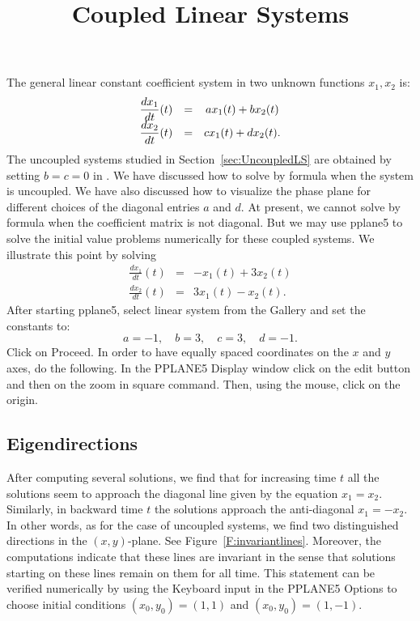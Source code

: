 \documentclass{ximera}
\title{Coupled Linear Systems}
\begin{document}
\begin{abstract}
\end{abstract}
\maketitle

  \label{s:3.5}


The general linear constant coefficient system in two unknown functions 
$x_1,x_2$ is:
\renewcommand{\arraystretch}{1.8}
\begin{equation}\label{lin3}
\begin{array}{ccc}
\displaystyle \frac{dx_1}{dt}(t) & = & ax_1(t) + bx_2(t) \\
\displaystyle \frac{dx_2}{dt}(t) & = & cx_1(t) + dx_2(t).
\end{array}
\end{equation}
\renewcommand{\arraystretch}{1.0}%
The uncoupled systems studied in Section~\ref{sec:UncoupledLS} are obtained 
by setting $b=c=0$ in .  We have discussed how to solve  
by formula  when the system is uncoupled.  We have also 
discussed how to visualize the phase plane for different choices of the 
diagonal entries $a$ and $d$.  At present, we cannot
solve  by formula when the coefficient matrix is not diagonal.
But we may use {\sf pplane5} to solve the initial value problems numerically 
for these coupled systems.  We illustrate this point by solving
\begin{eqnarray*}
\frac{dx_1}{dt}(t) & = &  -x_1(t) + 3x_2(t) \\
\frac{dx_2}{dt}(t) & = &  3x_1(t) - x_2(t).
\end{eqnarray*}
After starting {\sf pplane5}, select {\sf linear system} from the
{\sf Gallery} and set the constants to:
\[
	a = -1,\quad b = 3,\quad c = 3, \quad d = -1.
\]
Click on {\sf Proceed}.  In order to have equally spaced coordinates on
the $x$ and $y$ axes, do the following.   In the {\sf PPLANE5 Display} 
window click on the {\sf edit} button and then on the {\sf zoom in square} 
command.  Then, using the mouse, click on the origin.

\subsection*{Eigendirections}

After computing several solutions, we find that for increasing
time $t$ all the solutions seem to approach the diagonal line
given by the equation $x_1=x_2$. Similarly, in backward time $t$
the solutions approach the anti-diagonal $x_1=-x_2$.  In other
words, as for the case of uncoupled systems, we find two
distinguished directions in the $(x,y)$-plane.  See
Figure~\ref{F:invariantlines}.  Moreover, the computations
indicate that these lines are invariant in the sense that
solutions starting on these lines remain on them for all time.
This statement can be verified numerically by using the {\sf
Keyboard input} in the {\sf PPLANE5 Options} to choose initial
conditions $(x_0,y_0)=(1,1)$ and $(x_0,y_0)=(1,-1)$.
\end{document}
